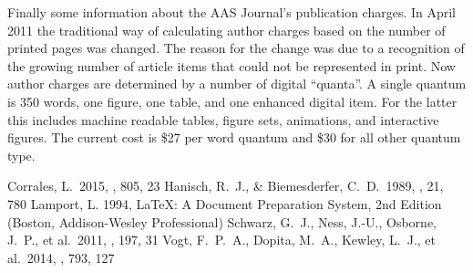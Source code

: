 \documentclass[twocolumn]{aastex6}
\newcommand\aastex{AAS\TeX}
\begin{document}
Finally some information about the AAS Journal's publication charges.
In April 2011 the traditional way of calculating author charges based on 
the number of printed pages was changed.  The reason for the change
was due to a recognition of the growing number of article items that could not 
be represented in print. Now author charges are determined by a number of
digital ``quanta''.  A single quantum is 350 words, one figure, one table,
and one enhanced digital item.  For the latter this includes machine readable
tables, figure sets, animations, and interactive figures.  The current cost
is \$27 per word quantum and \$30 for all other quantum type.




\begin{thebibliography}{}

 Corrales, L.\ 2015, \apj, 805, 23
 Hanisch, R.~J., \& Biemesderfer, C.~D.\ 1989, \baas, 21, 780 
 Lamport, L. 1994, LaTeX: A Document Preparation System, 2nd Edition (Boston, Addison-Wesley Professional)
 Schwarz, G.~J., Ness, J.-U., Osborne, J.~P., et al.\ 2011, \apjs, 197, 31  
 Vogt, F.~P.~A., Dopita, M.~A., Kewley, L.~J., et al.\ 2014, \apj, 793, 127  

\end{thebibliography}
\end{document}
